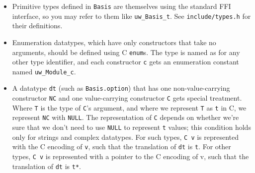 \documentclass{article}
\begin{document}
\begin{itemize}
  \item Primitive types defined in \texttt{Basis} are themselves using the standard FFI interface, so you may refer to them like \texttt{uw\_Basis\_t}.  See \texttt{include/types.h} for their definitions.
  \item Enumeration datatypes, which have only constructors that take no arguments, should be defined using C \texttt{enum}s.  The type is named as for any other type identifier, and each constructor \texttt{c} gets an enumeration constant named \texttt{uw\_Module\_c}.
  \item A datatype \texttt{dt} (such as \texttt{Basis.option}) that has one non-value-carrying constructor \texttt{NC} and one value-carrying constructor \texttt{C} gets special treatment.  Where \texttt{T} is the type of \texttt{C}'s argument, and where we represent \texttt{T} as \texttt{t} in C, we represent \texttt{NC} with \texttt{NULL}.  The representation of \texttt{C} depends on whether we're sure that we don't need to use \texttt{NULL} to represent \texttt{t} values; this condition holds only for strings and complex datatypes.  For such types, \texttt{C v} is represented with the C encoding of \texttt{v}, such that the translation of \texttt{dt} is \texttt{t}.  For other types, \texttt{C v} is represented with a pointer to the C encoding of v, such that the translation of \texttt{dt} is \texttt{t*}.
\end{itemize}
\end{document}
